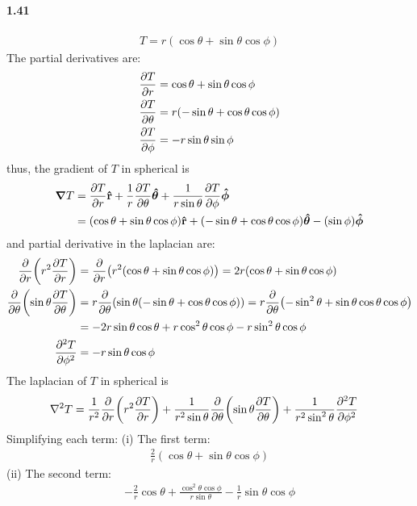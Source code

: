 \documentclass[../main.tex]{subfiles}
\begin{document}
\paragraph{1.41}
\begin{align*}
    T = r (\cos\theta + \sin\theta \cos\phi)
\end{align*}
The partial derivatives are:
\begin{align*}
    \pdv{T}{r}      &= \cos\theta + \sin\theta \cos\phi \\
    \pdv{T}{\theta} &= r (-\sin\theta + \cos\theta \cos\phi) \\
    \pdv{T}{\phi}   &= -r \sin\theta \sin\phi
\end{align*}
thus, the gradient of $T$ in spherical is
\begin{align*}
    \grad{T} &= \pdv{T}{r} \vu{r} + \frac{1}{r} \pdv{T}{\theta} \vu*{\theta}
        + \frac{1}{r \sin\theta} \pdv{T}{\phi} \vu*{\phi} \\
    &= (\cos\theta + \sin\theta \cos\phi) \vu{r}
        +  (-\sin\theta + \cos\theta \cos\phi) \vu*{\theta}
        - (\sin\phi) \vu*{\phi}
\end{align*}
and partial derivative in the laplacian are:
\begin{align*}
    \pdv{r}(r^2\pdv{T}{r}) &= \pdv{r}(r^2 (\cos\theta + \sin\theta \cos\phi))
        = 2r (\cos\theta + \sin\theta \cos\phi) \\
    \pdv{\theta}(\sin\theta \pdv{T}{\theta}) &=
        r \pdv{\theta}(\sin\theta (-\sin\theta + \cos\theta \cos\phi))
        = r \pdv{\theta} (-\sin^2\theta + \sin\theta \cos\theta \cos\phi) \\
    &= -2r\sin\theta \cos\theta + r\cos^2\theta \cos\phi - r\sin^2\theta \cos\phi \\
    \pdv[2]{T}{\phi} &= -r\sin\theta \cos\phi
\end{align*}
The laplacian of $T$ in spherical is
\begin{align*}
    \laplacian{T} &= \frac{1}{r^2} \pdv{r} (r^2 \pdv{T}{r}) +
        \frac{1}{r^2 \sin\theta} \pdv{\theta} (\sin\theta \pdv{T}{\theta}) +
        \frac{1}{r^2 \sin^2\theta} \pdv[2]{T}{\phi}
\end{align*}
Simplifying each term:
(i) The first term:
\begin{align*}
    \frac{2}{r} (\cos\theta + \sin\theta \cos\phi)
\end{align*}
(ii) The second term:
\begin{align*}
    -\frac{2}{r} \cos\theta + \frac{\cos^2\theta \cos\phi }{r \sin\theta} -
        \frac{1}{r} \sin\theta \cos\phi
\end{align*}
\end{document}
